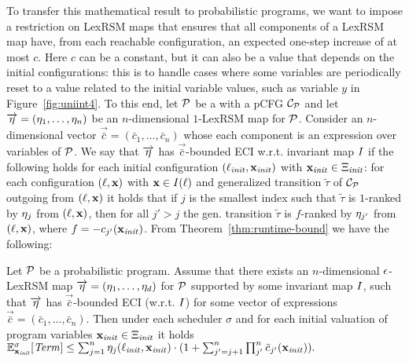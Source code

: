 To transfer this mathematical result to probabilistic programs, we want to 
impose a restriction on LexRSM maps that ensures that all components of a 
LexRSM map have, from each reachable configuration, an expected one-step 
increase of at most $c$. Here $c$ can be a constant, but it can also be a value 
that depends on the initial configurations: this is to handle cases where some 
variables are periodically reset to a value related to the initial variable 
values, such as variable $y$ in Figure~\ref{fig:uniint4}. To this end, let 
$\mathcal{P}$ be a \PP{} with a pCFG $\mathcal{C}_{\mathcal{P}}$ and let 
$\overrightarrow{\eta}=(\eta_1,\dots,\eta_n)$ be an 
$n$-dimensional $1$-LexRSM map for $\mathcal{P}$. Consider an $n$-dimensional 
vector 
$\vec{\bar{c}}=(\bar{c}_1,\dots,\bar{c}_n)$ whose each component is an 
expression over variables of 
$\mathcal{P}$. We say 
that $\overrightarrow{\eta}$ has 
$\vec{\bar{c}}$-bounded ECI w.r.t. invariant map $I$ if the following holds 
for each initial configuration $(\ell_{\mathit{init}},\mathbf{x}_{\mathit{init}})$ with $\mathbf{x}_{\mathit{init}}\in 
\Xi_{\mathit{init}}$: for 
each 
configuration $(\ell,\mathbf{x})$ with $\mathbf{x}\in I(\ell)$ and generalized 
transition $\tilde{\tau}$ 
of 
$\mathcal{C}_{\mathcal{P}}$ outgoing from $(\ell,\mathbf{x})$ it holds that if $j$ is 
the smallest index such that 
$\tilde{\tau}$ is $1$-ranked by $\eta_j$ from $(\ell,\mathbf{x})$, then for all 
$j'>j$ the gen. transition $\tilde{\tau}$ is $f$-ranked by $\eta_{j'}$ from 
$(\ell,\mathbf{x})$, where $f=-c_{j'}(\mathbf{x}_{\mathit{init}})$. From 
Theorem~\ref{thm:runtime-bound} we have the following:

\begin{corollary}
\label{col:runtime-progs}
Let $\mathcal{P}$ be a probabilistic program. Assume that there exists an 
$n$-dimensional $\epsilon$-LexRSM map $\overrightarrow{\eta}=(\eta_1,\dots,\eta_d)$ 
for 
$\mathcal{P}$ supported 
by some 
invariant map $I$, such that $\overrightarrow{\eta}$ has 
$\vec{\bar{c}}$-bounded ECI 
(w.r.t. $I$) 
for some vector of expressions $\vec{\bar{c}}=(\bar{c}_1,\dots,\bar{c}_n)$. 
Then under each scheduler $\sigma$ and for each initial valuation of program 
variables $\mathbf{x}_{\mathit{init}}\in\Xi_{\mathit{init}}$ it holds $\mathbb{E}^{\sigma}_{\mathbf{x}_{\mathit{init}}}[\mathit{Term}]\leq
\sum_{j=1}^{n}\eta_j(\ell_{\mathit{init}},\mathbf{x}_{\mathit{init}})\cdot(1+\sum_{j'= j+1}^{n}\prod_{j'}^{n} 
\bar{c}_{j'}(\mathbf{x}_{\mathit{init}})).$
\end{corollary}

